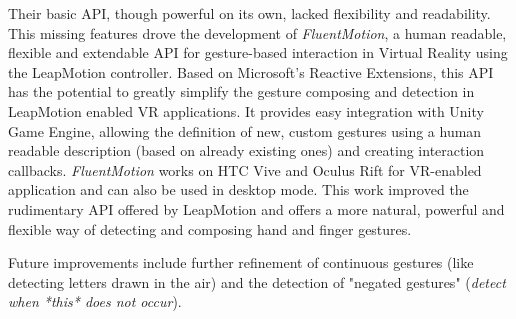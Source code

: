 \documentclass{sigchi}
\def\fluentmotion{\textit{FluentMotion}}
\def\rx{Reactive Extensions}
\def\unity{Unity Game Engine}
\def\leap{LeapMotion}
\def\vive{HTC Vive}
\def\oculus{Oculus Rift}
\begin{document}
Their basic API, though powerful on its own, lacked flexibility and readability. This missing features drove the development of \fluentmotion{}, a human readable, flexible and extendable API for gesture-based interaction in Virtual Reality using the \leap{} controller. Based on Microsoft's \rx{}, this API has the potential to greatly simplify the gesture composing and detection in \leap{} enabled VR applications. It provides easy integration with \unity{}, allowing the definition of new, custom gestures using a human readable description (based on already existing ones) and creating interaction callbacks. \fluentmotion{} works on \vive{} and \oculus{} for VR-enabled application and can also be used in desktop mode. This work improved the rudimentary API offered by \leap{} and offers a more natural, powerful and flexible way of detecting and composing hand and finger gestures.

Future improvements include further refinement of continuous gestures (like detecting letters drawn in the air) and the detection of "negated gestures" (\textit{detect when *this* does not occur}).

\balance{}



\end{document}
